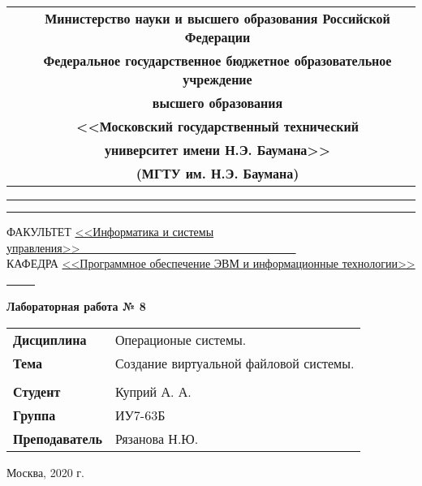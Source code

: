 \pagestyle{empty}
    \begin{table}[H]
        \centering
        \footnotesize
        \begin{tabular}{cc}
            & \textbf{Министерство науки и высшего образования Российской Федерации} \\
            & \textbf{Федеральное государственное бюджетное образовательное учреждение} \\
            & \textbf{высшего образования} \\
            & \textbf{<<Московский государственный технический} \\
            & \textbf{университет имени Н.Э. Баумана>>} \\
            & \textbf{(МГТУ им. Н.Э. Баумана)} \\
        \end{tabular}
    \end{table}

    \vspace{-2.5cm}

    \begin{flushleft}
        \rule[-1cm]{\textwidth}{3pt}
        \rule{\textwidth}{1pt}
    \end{flushleft}

    \begin{flushleft}
        \small
        ФАКУЛЬТЕТ
        \underline{<<Информатика и системы управления>>\ \ \ \ \ \ \ 
        \ \ \ \ \ \ \ \ \ \ \ \ \ \ \ \ \ \ \ \ \ \ \ \ \ \ \ \ \ \ \  } \\
        КАФЕДРА
        \underline{<<Программное обеспечение ЭВМ и
        информационные технологии>>
        \ \ \ \ \ }
    \end{flushleft}

    \vspace{1cm}

    \begin{center}
        \textbf{Лабораторная работа № 8} \\
        \vspace{0.5cm}
    \end{center}

    \vspace{4cm}

    \begin{flushleft}
        \begin{tabular}{ll}
            \textbf{Дисциплина} & Операционые системы. \\
            \textbf{Тема} & Создание виртуальной файловой системы. \\
            \\
            \textbf{Студент} & Куприй А. А. \\
            \textbf{Группа} & ИУ7-63Б \\
            \textbf{Преподаватель} & Рязанова Н.Ю. \\
        \end{tabular}
    \end{flushleft}

    \vspace{6cm}

    \begin{center}
        Москва, 2020 г.
    \end{center}
